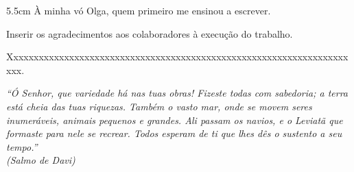 \begin{folhadeaprovacao}
	\vspace*{\baselineskip}

	\vspace*{\baselineskip}

	\vspace*{\baselineskip}

\end{folhadeaprovacao}

\begin{dedicatoria}
	\vspace*{\fill}
	\noindent
	\begin{adjustwidth*}{}{5.5cm}     
		À minha vó Olga, quem primeiro me ensinou a escrever.
	\end{adjustwidth*}
\end{dedicatoria}

\begin{agradecimentos}
	Inserir os agradecimentos aos colaboradores à execução do trabalho. 
	
	Xxxxxxxxxxxxxxxxxxxxxxxxxxxxxxxxxxxxxxxxxxxxxxxxxxxxxxxxxxxxxxxxxxxxxx. 
\end{agradecimentos}

\begin{epigrafe}
	\vspace*{\fill}
	\begin{flushright}
		\textit{``Ó Senhor, que variedade há nas tuas obras! Fizeste todas com sabedoria; a terra está cheia das tuas riquezas.
		Também o vasto mar, onde se movem seres inumeráveis, animais pequenos e grandes.
		Ali passam os navios, e o Leviatã que formaste para nele se recrear.
		Todos esperam de ti que lhes dês o sustento a seu tempo.''\\
			(Salmo de Davi)}
	\end{flushright}
\end{epigrafe}


